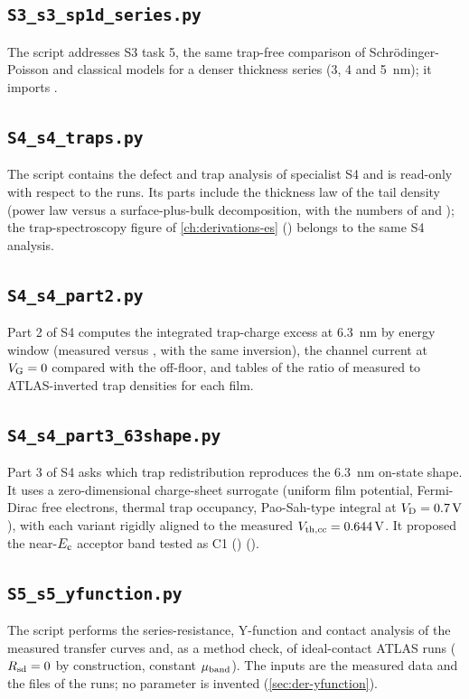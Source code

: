 \subsection{\texttt{S3\_s3\_sp1d\_series.py}}
The script addresses S3 task 5, the same trap-free comparison of Schr\"odinger-Poisson and classical models for a denser
thickness series (3, 4 and \SI{5}{nm}); it imports .


\subsection{\texttt{S4\_s4\_traps.py}}
The script contains the defect and trap analysis of specialist S4 and is read-only with respect to the runs. Its parts
include the thickness law of the tail density (power law versus a surface-plus-bulk decomposition, with the numbers of
\citet[pp.~7, 9]{Januar2026} and \citet[pp.~173507-3, 173507-6]{Kim2024}); the trap-spectroscopy figure of
\cref{ch:derivations-es} () belongs to the same S4 analysis.


\subsection{\texttt{S4\_s4\_part2.py}}
Part 2 of S4 computes the integrated trap-charge excess at \SI{6.3}{nm} by energy window (measured versus ,
with the same inversion), the channel current at $V_{\mathrm{G}} = 0$ compared with the off-floor, and tables of the ratio of
measured to ATLAS-inverted trap densities for each film.


\subsection{\texttt{S4\_s4\_part3\_63shape.py}}
Part 3 of S4 asks which trap redistribution reproduces the \SI{6.3}{nm} on-state shape. It uses a zero-dimensional
charge-sheet surrogate (uniform film potential, Fermi-Dirac free electrons, thermal trap occupancy, Pao-Sah-type integral
at $V_{\mathrm{D}} = \SI{0.7}{V}$), with each variant rigidly aligned to the measured $V_{\mathrm{th,cc}} = \SI{0.644}{V}$. It proposed the
near-$E_{\mathrm{c}}$ acceptor band tested as C1 () (\evSURR).


\subsection{\texttt{S5\_s5\_yfunction.py}}
The script performs the series-resistance, Y-function and contact analysis of the measured transfer curves and, as a
method check, of ideal-contact ATLAS runs ($R_{\mathrm{sd}} = 0$ by construction, constant $\mu_{\mathrm{band}}$). The inputs are the measured
data and the  files of the runs; no parameter is invented (\cref{sec:der-yfunction}).


